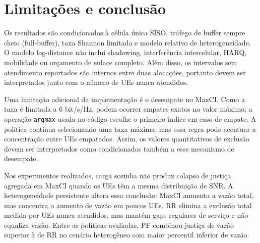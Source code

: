 \documentclass[12pt]{article}
\begin{document}
\FloatBarrier
\section{Limitações e conclusão}

Os resultados são condicionados à célula única SISO, tráfego de buffer sempre cheio (full-buffer), taxa Shannon limitada e modelo relativo de heterogeneidade. O modelo log-distance não inclui shadowing, interferência intercelular, HARQ, mobilidade ou orçamento de enlace completo. Além disso, os intervalos sem atendimento reportados são internos entre duas alocações, portanto devem ser interpretados junto com o número de UEs nunca atendidos.

Uma limitação adicional da implementação é o desempate no MaxCI. Como a taxa é limitada a 6 bit/s/Hz, podem ocorrer empates exatos no valor máximo; a operação \texttt{argmax} usada no código escolhe o primeiro índice em caso de empate. A política continua selecionando uma taxa máxima, mas essa regra pode acentuar a concentração entre UEs empatados. Assim, os valores quantitativos de exclusão devem ser interpretados como condicionados também a esse mecanismo de desempate.

Nos experimentos realizados, carga sozinha não produz colapso de justiça agregada em MaxCI quando os UEs têm a mesma distribuição de SNR. A heterogeneidade persistente altera essa conclusão: MaxCI aumenta a vazão total, mas concentra o aumento de vazão em poucos UEs. RR elimina a exclusão total medida por UEs nunca atendidos, mas mantém gaps regulares de serviço e não equaliza vazão. Entre as políticas avaliadas, PF combinou justiça de vazão superior à de RR no cenário heterogêneo com maior percentil inferior de vazão.



\end{document}
